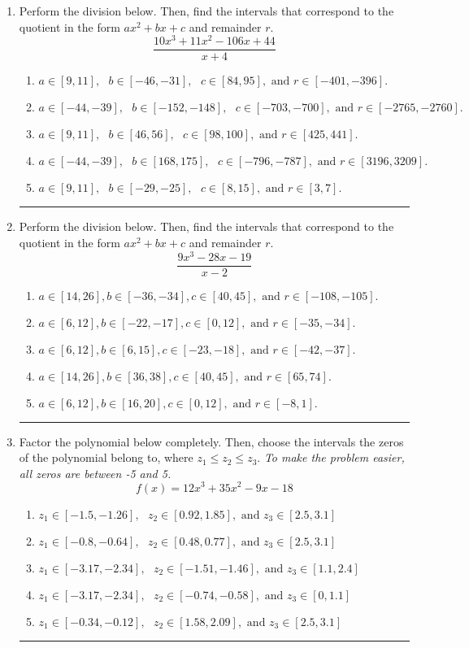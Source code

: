 \documentclass[14pt]{extbook}
\newcommand{\litem}[1]{\item#1\hspace*{-1cm}\rule{\textwidth}{0.4pt}}
\begin{document}
\begin{enumerate}
{\begin{enumerate}[label=\Alph*.]
\end{enumerate} }
\litem{
Perform the division below. Then, find the intervals that correspond to the quotient in the form $ax^2+bx+c$ and remainder $r$.\[ \frac{10x^{3} +11 x^{2} -106 x + 44}{x + 4} \]\begin{enumerate}[label=\Alph*.]
\item \( a \in [9, 11], \text{   } b \in [-46, -31], \text{   } c \in [84, 95], \text{   and   } r \in [-401, -396]. \)
\item \( a \in [-44, -39], \text{   } b \in [-152, -148], \text{   } c \in [-703, -700], \text{   and   } r \in [-2765, -2760]. \)
\item \( a \in [9, 11], \text{   } b \in [46, 56], \text{   } c \in [98, 100], \text{   and   } r \in [425, 441]. \)
\item \( a \in [-44, -39], \text{   } b \in [168, 175], \text{   } c \in [-796, -787], \text{   and   } r \in [3196, 3209]. \)
\item \( a \in [9, 11], \text{   } b \in [-29, -25], \text{   } c \in [8, 15], \text{   and   } r \in [3, 7]. \)

\end{enumerate} }
\litem{
Perform the division below. Then, find the intervals that correspond to the quotient in the form $ax^2+bx+c$ and remainder $r$.\[ \frac{9x^{3} -28 x -19}{x -2} \]\begin{enumerate}[label=\Alph*.]
\item \( a \in [14, 26], b \in [-36, -34], c \in [40, 45], \text{ and } r \in [-108, -105]. \)
\item \( a \in [6, 12], b \in [-22, -17], c \in [0, 12], \text{ and } r \in [-35, -34]. \)
\item \( a \in [6, 12], b \in [6, 15], c \in [-23, -18], \text{ and } r \in [-42, -37]. \)
\item \( a \in [14, 26], b \in [36, 38], c \in [40, 45], \text{ and } r \in [65, 74]. \)
\item \( a \in [6, 12], b \in [16, 20], c \in [0, 12], \text{ and } r \in [-8, 1]. \)

\end{enumerate} }
\litem{
Factor the polynomial below completely. Then, choose the intervals the zeros of the polynomial belong to, where $z_1 \leq z_2 \leq z_3$. \textit{To make the problem easier, all zeros are between -5 and 5.}\[ f(x) = 12x^{3} +35 x^{2} -9 x -18 \]\begin{enumerate}[label=\Alph*.]
\item \( z_1 \in [-1.5, -1.26], \text{   }  z_2 \in [0.92, 1.85], \text{   and   } z_3 \in [2.5, 3.1] \)
\item \( z_1 \in [-0.8, -0.64], \text{   }  z_2 \in [0.48, 0.77], \text{   and   } z_3 \in [2.5, 3.1] \)
\item \( z_1 \in [-3.17, -2.34], \text{   }  z_2 \in [-1.51, -1.46], \text{   and   } z_3 \in [1.1, 2.4] \)
\item \( z_1 \in [-3.17, -2.34], \text{   }  z_2 \in [-0.74, -0.58], \text{   and   } z_3 \in [0, 1.1] \)
\item \( z_1 \in [-0.34, -0.12], \text{   }  z_2 \in [1.58, 2.09], \text{   and   } z_3 \in [2.5, 3.1] \)


\end{enumerate}}
\end{enumerate}
\end{document}
